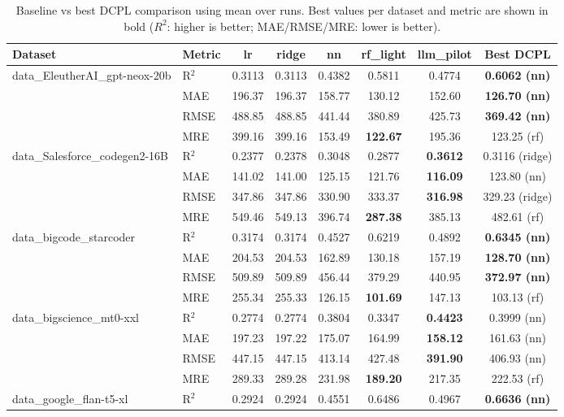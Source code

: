 \begin{table}[t]
\centering
\small
\caption{Baseline vs best DCPL comparison using mean over runs. Best values per dataset and metric are shown in bold ($R^2$: higher is better; MAE/RMSE/MRE: lower is better).}
\label{tab:baseline-vs-best-dcpl}
\begin{tabular}{llcccccc}
\toprule
Dataset & Metric & lr & ridge & nn & rf\_light & llm\_pilot & Best DCPL \\
\midrule
data\_EleutherAI\_gpt-neox-20b & R$^2$ & 0.3113 & 0.3113 & 0.4382 & 0.5811 & 0.4774 & \textbf{0.6062 (nn)} \\
 & MAE & 196.37 & 196.37 & 158.77 & 130.12 & 152.60 & \textbf{126.70 (nn)} \\
 & RMSE & 488.85 & 488.85 & 441.44 & 380.89 & 425.73 & \textbf{369.42 (nn)} \\
 & MRE & 399.16 & 399.16 & 153.49 & \textbf{122.67} & 195.36 & 123.25 (rf) \\
\addlinespace
data\_Salesforce\_codegen2-16B & R$^2$ & 0.2377 & 0.2378 & 0.3048 & 0.2877 & \textbf{0.3612} & 0.3116 (ridge) \\
 & MAE & 141.02 & 141.00 & 125.15 & 121.76 & \textbf{116.09} & 123.80 (nn) \\
 & RMSE & 347.86 & 347.86 & 330.90 & 333.37 & \textbf{316.98} & 329.23 (ridge) \\
 & MRE & 549.46 & 549.13 & 396.74 & \textbf{287.38} & 385.13 & 482.61 (rf) \\
\addlinespace
data\_bigcode\_starcoder & R$^2$ & 0.3174 & 0.3174 & 0.4527 & 0.6219 & 0.4892 & \textbf{0.6345 (nn)} \\
 & MAE & 204.53 & 204.53 & 162.89 & 130.18 & 157.19 & \textbf{128.70 (nn)} \\
 & RMSE & 509.89 & 509.89 & 456.44 & 379.29 & 440.95 & \textbf{372.97 (nn)} \\
 & MRE & 255.34 & 255.33 & 126.15 & \textbf{101.69} & 147.13 & 103.13 (rf) \\
\addlinespace
data\_bigscience\_mt0-xxl & R$^2$ & 0.2774 & 0.2774 & 0.3804 & 0.3347 & \textbf{0.4423} & 0.3999 (nn) \\
 & MAE & 197.23 & 197.22 & 175.07 & 164.99 & \textbf{158.12} & 161.63 (nn) \\
 & RMSE & 447.15 & 447.15 & 413.14 & 427.48 & \textbf{391.90} & 406.93 (nn) \\
 & MRE & 289.33 & 289.28 & 231.98 & \textbf{189.20} & 217.35 & 222.53 (rf) \\
\addlinespace
data\_google\_flan-t5-xl & R$^2$ & 0.2924 & 0.2924 & 0.4551 & 0.6486 & 0.4967 & \textbf{0.6636 (nn)} \\

\end{tabular}
\end{table}
